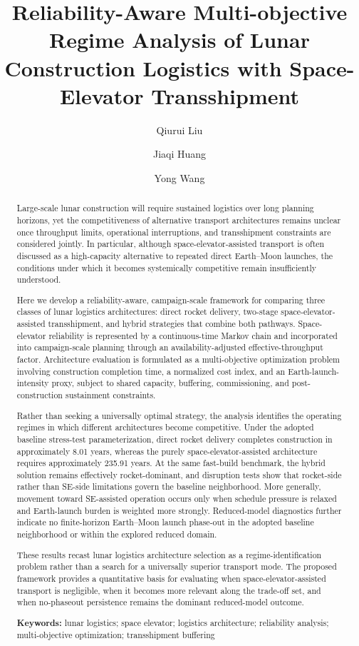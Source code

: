 \documentclass[12pt]{article}
\title{Reliability-Aware Multi-objective Regime Analysis of Lunar Construction Logistics with Space-Elevator Transshipment}
\author[1]{Qiurui Liu}
\author[1]{Jiaqi Huang}
\author[2,*]{Yong Wang}
\affil[1]{School of International Exchange, Guangzhou Maritime University, Guangzhou 510725, China}
\affil[2]{School of Arts and Sciences, Guangzhou Maritime University, Guangzhou 510725, China}
\affil[*]{Corresponding author: \texttt{p117646@siswa.ukm.edu.my}}
\date{}
\begin{document}
	\maketitle
	
	\begin{abstract}
		Large-scale lunar construction will require sustained logistics over long planning horizons, yet the competitiveness of alternative transport architectures remains unclear once throughput limits, operational interruptions, and transshipment constraints are considered jointly. In particular, although space-elevator-assisted transport is often discussed as a high-capacity alternative to repeated direct Earth--Moon launches, the conditions under which it becomes systemically competitive remain insufficiently understood.
		
		Here we develop a reliability-aware, campaign-scale framework for comparing three classes of lunar logistics architectures: direct rocket delivery, two-stage space-elevator-assisted transshipment, and hybrid strategies that combine both pathways. Space-elevator reliability is represented by a continuous-time Markov chain and incorporated into campaign-scale planning through an availability-adjusted effective-throughput factor. Architecture evaluation is formulated as a multi-objective optimization problem involving construction completion time, a normalized cost index, and an Earth-launch-intensity proxy, subject to shared capacity, buffering, commissioning, and post-construction sustainment constraints.
		
		Rather than seeking a universally optimal strategy, the analysis identifies the operating regimes in which different architectures become competitive. Under the adopted baseline stress-test parameterization, direct rocket delivery completes construction in approximately 8.01 years, whereas the purely space-elevator-assisted architecture requires approximately 235.91 years. At the same fast-build benchmark, the hybrid solution remains effectively rocket-dominant, and disruption tests show that rocket-side rather than SE-side limitations govern the baseline neighborhood. More generally, movement toward SE-assisted operation occurs only when schedule pressure is relaxed and Earth-launch burden is weighted more strongly. Reduced-model diagnostics further indicate no finite-horizon Earth--Moon launch phase-out in the adopted baseline neighborhood or within the explored reduced domain.
		
		These results recast lunar logistics architecture selection as a regime-identification problem rather than a search for a universally superior transport mode. The proposed framework provides a quantitative basis for evaluating when space-elevator-assisted transport is negligible, when it becomes more relevant along the trade-off set, and when no-phaseout persistence remains the dominant reduced-model outcome.
		
		\noindent\textbf{Keywords:} lunar logistics; space elevator; logistics architecture; reliability analysis; multi-objective optimization; transshipment buffering
	\end{abstract}
	
\end{document}
